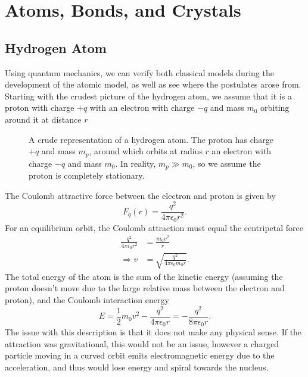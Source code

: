\documentclass{article}
\begin{document}
\section{Atoms, Bonds, and Crystals}
\subsection{Hydrogen Atom}
Using quantum mechanics, we can verify both classical models during the development of the atomic model, as well as see where the postulates arose from. Starting with the crudest picture of the hydrogen atom, we assume that it is a proton with charge $+q$ with an electron with charge $-q$ and mass $m_0$ orbiting around it at distance $r$
\begin{figure}[H]
    \centering
    \caption{A crude representation of a hydrogen atom. The proton has charge $+q$ and mass $m_p$, around which orbits at radius $r$ an electron with charge $-q$ and mass $m_0$. In reality, $m_p\gg m_0$, so we assume the proton is completely stationary.}
    \label{fig:hydrogen-atom}
\end{figure}

The Coulomb attractive force between the electron and proton is given by 
\[
    F_q(r)=\frac{q^2}{4\pi \epsilon _0r^2}.
\]
For an equilibrium orbit, the Coulomb attraction must equal the centripetal force
\begin{align*}
    \frac{q^2}{4\pi \epsilon _0r^2} &= \frac{m_0v^2}{r}\\
    \Rightarrow v&=\sqrt{\frac{q^2}{4\pi \epsilon_0m_0r}}.
\end{align*}
The total energy of the atom is the sum of the kinetic energy (assuming the proton doesn't move due to the large relative mass between the electron and proton), and the Coulomb interaction energy 
\[
    E=\frac{1}{2}m_0v^2-\frac{q^2}{4\pi \epsilon_0r}=-\frac{q^2}{8\pi \epsilon _0r}.
\]
The issue with this description is that it does not make any physical sense. If the attraction was gravitational, this would not be an issue, however a charged particle moving in a curved orbit emits electromagnetic energy due to the acceleration, and thus would lose energy and spiral towards the nucleus.
\end{document}
